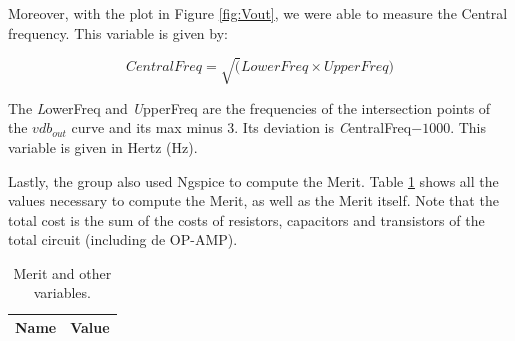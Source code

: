 Moreover, with the plot in Figure \ref{fig:Vout}, we were able to measure the Central frequency. This variable is given by: 

\[
CentralFreq = \sqrt(LowerFreq\times UpperFreq) 
\]

The {\emph LowerFreq} and {\emph UpperFreq} are the frequencies of the intersection points of the $vdb_{out}$ curve and its max minus $3$. Its deviation is {\emph CentralFreq}$-1000$. This variable is given in Hertz (Hz).


Lastly, the group also used Ngspice to compute the Merit. Table \ref{tab:merit} shows all the 
values necessary to compute the Merit, as well as the Merit itself. Note that the total cost is the sum 
of the costs of resistors, capacitors and transistors of the total circuit (including de OP-AMP).

\begin{table}[ht]
	\centering
	\begin{tabular}{|l|r|}
		\hline    
		{\bf Name} & {\bf Value} \\ \hline
    		
	\end{tabular}
	
	\caption{Merit and other variables.}
    
\label{tab:merit}
\end{table}


